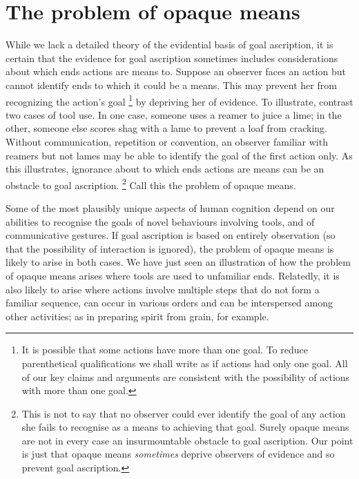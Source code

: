 \documentclass[12pt,a4paper]{extarticle}
\begin{document}
\section{The problem of opaque means}

While we lack a detailed theory of the evidential basis of goal ascription,
it is certain that the evidence for goal ascription sometimes includes considerations about which ends actions are means to.
Suppose an observer faces an action but cannot identify ends to which it could be a means.
This may prevent her from recognizing the action's goal%
\footnote{
It is possible that some actions have more than one goal.
To reduce parenthetical qualifications we shall write as if actions had only one goal.  
All of our key claims and arguments are consistent with the possibility of actions with more than one goal.
} 
 by depriving her of evidence.
To illustrate, contrast two cases of tool use.
In one case, someone uses a reamer to  juice  a lime; in the other, someone else scores shag with a lame to prevent a loaf from cracking.
Without communication, repetition or convention,
an observer familiar with reamers but not lames 
may be able to identify the goal of the first action only.
As this illustrates, ignorance about to which ends actions are means can be an obstacle to goal ascription.%
\footnote{
This is not to say that no observer could ever identify the goal of any action she fails to recognise as a means to achieving that goal.
Surely opaque means are not in every case an insurmountable obstacle to goal ascription.
Our point is just that opaque means \emph{sometimes}  deprive observers of evidence and so prevent goal ascription.
}
Call this the problem of opaque means.

Some of the most plausibly unique aspects of human cognition depend on our abilities to recognise the goals of novel behaviours involving tools, and of communicative gestures.
If goal ascription is based on entirely observation 
(so that the possibility of interaction is ignored),
the problem of opaque means is likely to arise in both cases.
We have just seen an illustration of how the problem of opaque means arises where tools are used to unfamiliar ends.
Relatedly, it is also likely to arise where actions involve multiple steps that do not form a familiar sequence, can occur in various orders and can be interspersed among other activities;
as in preparing spirit from grain, for example.
\end{document}
